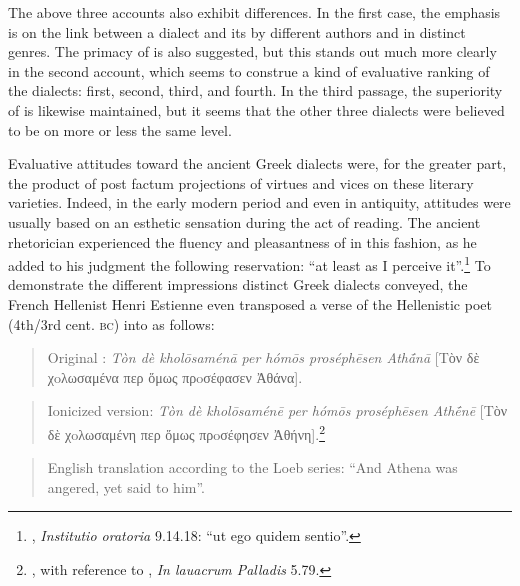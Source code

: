 The above three accounts also exhibit differences. In the first case, the emphasis is on the link between a dialect and its  by different authors and in distinct genres. The primacy of  is also suggested, but this stands out much more clearly in the second account, which seems to construe a kind of evaluative ranking of the dialects:  first,  second,  third, and  fourth. In the third passage, the superiority of  is likewise maintained, but it seems that the other three dialects were believed to be on more or less the same level.

Evaluative attitudes toward the ancient Greek dialects were, for the greater part, the product of post factum projections of virtues and vices on these literary varieties. Indeed, in the early modern period and even in antiquity, attitudes were usually based on an esthetic sensation during the act of reading. The ancient  rhetorician  experienced the fluency and pleasantness of  in this fashion, as he added to his judgment the following reservation: “at least as I perceive it”.\footnote{, \textit{Institutio oratoria} 9.14.18: “ut ego quidem sentio”.} To demonstrate the different impressions distinct Greek dialects conveyed, the French Hellenist Henri Estienne even transposed a  verse of the Hellenistic poet  (4th/3rd cent. \textsc{bc}) into  as follows:

\begin{quote}
Original : \textit{Tòn dè kholōsaménā per hómōs proséphēsen Athā́nā} [Tὸν δὲ χoλωσαμένα περ ὅμως πρoσέφασεν Ἀθάνα].
\end{quote}

\begin{quote}
Ionicized version: \textit{Tòn dè kholōsaménē per hómōs proséphēsen Athḗnē} [Tὸν δὲ χoλωσαμένη περ ὅμως πρoσέφησεν Ἀθήνη].\footnote{\citet[15--16]{Estienne1581}, with reference to , \textit{In lauacrum Palladis} 5.79.}
\end{quote}

\begin{quote}
English translation according to the Loeb series: “And Athena was angered, yet said to him”.
\end{quote}

